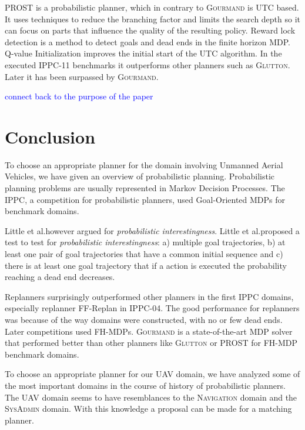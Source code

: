 \documentclass[runningheads,a4paper]{llncs}
\newcommand\todo[1]{\textcolor{blue}{#1}}
\begin{document}
PROST \cite{keller2012prost} is a probabilistic planner, which in contrary to
\textsc{Gourmand} is UTC based. It uses techniques to reduce the branching
factor and limits the search depth so it can focus on parts that
influence the quality of the resulting policy. Reward lock detection is a
method to detect goals and dead ends in the finite horizon MDP\@. Q-value
Initialization improves the initial start of the UTC algorithm. In the executed
IPPC-11 benchmarks it outperforms other planners such as \textsc{Glutton}.
Later it has been surpassed by \textsc{Gourmand}.

\todo{connect back to the purpose of the paper}


\section{Conclusion}
\label{sec:conclusion}

To choose an appropriate planner for the domain involving Unmanned Aerial
Vehicles, we have given an overview of probabilistic planning. Probabilistic
planning problems are usually represented in Markov Decision Processes. The
IPPC, a competition for probabilistic planners, used Goal-Oriented MDPs for
benchmark domains.

Little et al.\@ however argued for \emph{probabilistic
interestingness}. Little et al.\@ proposed a test to test for \emph{probabilistic
interestingness}: a) multiple goal trajectories, b) at least one pair of goal
trajectories that have a common initial sequence and c) there is at least one
goal trajectory that if a action is executed the probability reaching a dead
end decreases.

Replanners surprisingly outperformed other planners in the first IPPC domains,
especially replanner FF-Replan in IPPC-04. The good performance for replanners was
because of the way domains were constructed, with no or few dead ends.
Later competitions used FH-MDPs. \textsc{Gourmand} is a state-of-the-art MDP
solver that performed better than other planners like \textsc{Glutton} or PROST
for FH-MDP benchmark domains.

To choose an appropriate planner for our UAV domain, we have analyzed some of
the most important domains in the course of history of probabilistic planners.
The UAV domain seems to have resemblances to the \textsc{Navigation} domain
and the \textsc{SysAdmin} domain. With this knowledge a proposal can be made
for a matching planner.
\end{document}
